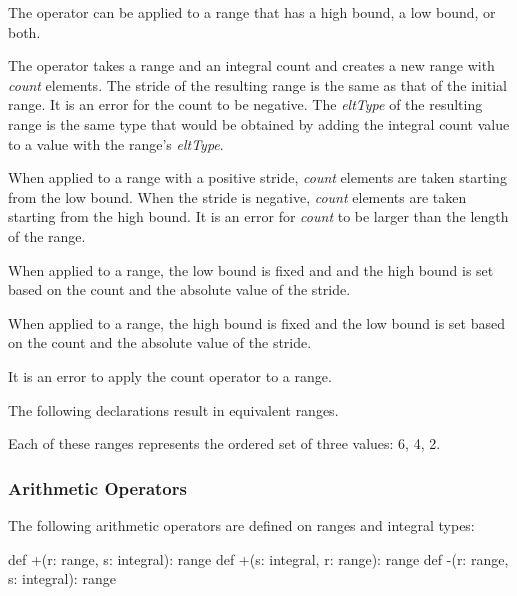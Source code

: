 The \chpl{#} operator can be applied to a range that has a high bound,
a low bound, or both.

The \chpl{#} operator takes a range and an integral count and creates
a new range with \emph{count} elements. The stride of the resulting range is
the same as that of the initial range. It is an error for the count to
be negative.  The \emph{eltType} of the resulting range is the same
type that would be obtained by adding the integral count value to a value
with the range's \emph{eltType}.

When applied to a  range with a positive
stride, \emph{count} elements are taken starting from the low
bound. When the stride is negative, \emph{count} elements are taken
starting from the high bound. It is an error for \emph{count} to be larger
than the length of the range.

When applied to a  range, the low bound
is fixed and and the high bound is set based on the count and the
absolute value of the stride.

When applied to a  range, the high
bound is fixed and the low bound is set based on the count and the
absolute value of the stride.

It is an error to apply the count operator to a
 range.

\begin{example}
The following declarations result in equivalent ranges.
Each of these ranges represents the ordered set of three values: 6, 4, 2.
\end{example}

\subsubsection{Arithmetic Operators}
\label{Range_Arithmetic}

The following arithmetic operators are defined on ranges and integral
types:

\begin{chapel}
def +(r: range, s: integral): range
def +(s: integral, r: range): range
def -(r: range, s: integral): range
\end{chapel}

